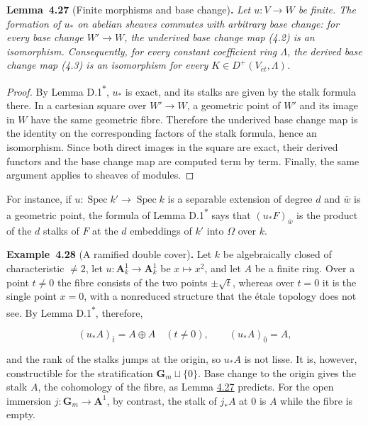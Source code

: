 \documentclass[11pt]{article}
\newenvironment{bpstatement}[2]{\par\addvspace{0.6\baselineskip}\noindent\textbf{#1}#2\textbf{.}\enspace\ignorespaces}
  {\par\addvspace{0.4\baselineskip}}
\newenvironment{bpstatementit}[2]{\begin{bpstatement}{#1}{#2}\itshape\ignorespaces}{\end{bpstatement}}
\newcommand{\bpout}[1]{#1\textsuperscript{\hyperlink{bp-outside}{\ensuremath{\ast}}}}
\begin{document}
\label{bp364}%
\begin{bpstatementit}{Lemma~4.27}{ (Finite morphisms and base change)}
Let \(u:V\to W\) be finite. The formation of \(u_*\) on abelian sheaves commutes with arbitrary base change: for every base change \(W'\to W\), the underived base change map (4.2) is an isomorphism. Consequently, for every constant coefficient ring \(\Lambda\), the derived base change map (4.3) is an isomorphism for every \(K\in D^+(V_{\acute{e}t},\Lambda)\).
\end{bpstatementit}

\begin{proof}[{Proof}]\label{bp365}%
By Lemma \bpout{D.1}, \(u_*\) is exact, and its stalks are given by the stalk formula there. In a cartesian square over \(W'\to W\), a geometric point of \(W'\) and its image in \(W\) have the same geometric fibre. Therefore the underived base change map is the identity on the corresponding factors of the stalk formula, hence an isomorphism. Since both direct images in the square are exact, their derived functors and the base change map are computed term by term. Finally, the same argument applies to sheaves of modules.
\end{proof}

\label{bp366}%
For instance, if \(u:\operatorname{Spec}k'\to\operatorname{Spec}k\) is a separable extension of degree \(d\) and \(\bar w\) is a geometric point, the formula of Lemma \bpout{D.1} says that \((u_*F)_{\bar w}\) is the product of the \(d\) stalks of \(F\) at the \(d\) embeddings of \(k'\) into \(\Omega\) over \(k\).

\label{bp367}%
\begin{bpstatement}{Example~4.28}{ (A ramified double cover)}
Let \(k\) be algebraically closed of characteristic \(\neq2\), let \(u:\mathbf A^1_k\to\mathbf A^1_k\) be \(x\mapsto x^2\), and let \(A\) be a finite ring. Over a point \(t\neq0\) the fibre consists of the two points \(\pm\sqrt t\), whereas over \(t=0\) it is the single point \(x=0\), with a nonreduced structure that the étale topology does not see. By Lemma \bpout{D.1}, therefore,

\[
(u_*A)_{\bar t}=A\oplus A\quad(t\neq0),\qquad (u_*A)_{\bar0}=A,
\]

and the rank of the stalks jumps at the origin, so \(u_*A\) is not lisse. It is, however, constructible for the stratification \(\mathbf G_m\sqcup\{0\}\). Base change to the origin gives the stalk \(A\), the cohomology of the fibre, as Lemma \hyperref[bp364]{4.27} predicts. For the open immersion \(j:\mathbf G_m\to\mathbf A^1\), by contrast, the stalk of \(j_*A\) at \(0\) is \(A\) while the fibre is empty.
\end{bpstatement}
\end{document}
